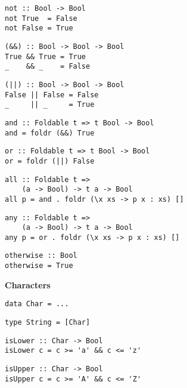 \begin{multicols}{2}
\begin{verbatim}
not :: Bool -> Bool
not True  = False
not False = True
\end{verbatim}
	
\begin{verbatim}
(&&) :: Bool -> Bool -> Bool
True && True = True 
_    && _    = False
\end{verbatim}
	
\begin{verbatim}
(||) :: Bool -> Bool -> Bool
False || False = False 
_     || _     = True
\end{verbatim}
	
\begin{verbatim}
and :: Foldable t => t Bool -> Bool 
and = foldr (&&) True
\end{verbatim}
	
\begin{verbatim}
or :: Foldable t => t Bool -> Bool 
or = foldr (||) False
\end{verbatim}
	
\begin{verbatim}
all :: Foldable t => 
    (a -> Bool) -> t a -> Bool
all p = and . foldr (\x xs -> p x : xs) []
\end{verbatim}
	
\begin{verbatim}
any :: Foldable t => 
    (a -> Bool) -> t a -> Bool
any p = or . foldr (\x xs -> p x : xs) []
\end{verbatim}
	
\begin{verbatim}
otherwise :: Bool
otherwise = True
\end{verbatim}
	
\textbf{\large Characters}\\
	
\begin{verbatim}
data Char = ...
\end{verbatim}
	
\begin{verbatim}
type String = [Char]
\end{verbatim}
	
\begin{verbatim}
isLower :: Char -> Bool 
isLower c = c >= 'a' && c <= 'z'
\end{verbatim}
	
\begin{verbatim}
isUpper :: Char -> Bool 
isUpper c = c >= 'A' && c <= 'Z'
\end{verbatim}
	

\end{multicols}
